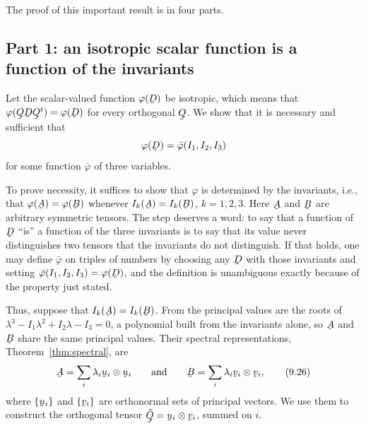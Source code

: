 The proof of this important result is in four parts.

\subsection*{Part 1: an isotropic scalar function is a function of the
invariants}

Let the scalar-valued function $\varphi(\bD)$ be isotropic, which means
that $\varphi(\bQ\bD\bQ^{t})=\varphi(\bD)$ for every orthogonal $\bQ$.
We show that it is necessary and sufficient that
\[
   \varphi(\bD)=\bar\varphi(I_{1},I_{2},I_{3})
\]
for some function $\bar\varphi$ of three variables.

To prove necessity, it suffices to show that $\varphi$ is determined by
the invariants, i.e., that $\varphi(\bA)=\varphi(\bB)$ whenever
$I_{k}(\bA)=I_{k}(\bB)$, $k=1,2,3$. Here $\bA$ and $\bB$ are arbitrary
symmetric tensors. The step deserves a word: to say that a function of
$\bD$ ``is'' a function of the three invariants is to say that its value
never distinguishes two tensors that the invariants do not distinguish.
If that holds, one may define $\bar\varphi$ on triples of numbers by
choosing any $\bD$ with those invariants and setting
$\bar\varphi(I_{1},I_{2},I_{3})=\varphi(\bD)$, and the definition is
unambiguous exactly because of the property just stated.

Thus, suppose that $I_{k}(\bA)=I_{k}(\bB)$. From  the principal
values are the roots of
$\lambda^{3}-I_{1}\lambda^{2}+I_{2}\lambda-I_{3}=0$, a polynomial built
from the invariants alone, so $\bA$ and $\bB$ share the same principal
values. Their spectral representations, Theorem~\ref{thm:spectral}, are
\begin{equation}
   \bA=\sum_{i}\lambda_{i}\bu_{i}\otimes\bu_{i}
   \qquad\text{and}\qquad
   \bB=\sum_{i}\lambda_{i}\bv_{i}\otimes\bv_{i},
   \tag{9.26}\label{eq:9.26}
\end{equation}
where $\{\bu_{i}\}$ and $\{\bv_{i}\}$ are orthonormal sets of principal
vectors. We use them to construct the orthogonal tensor
$\tilde\bQ=\bu_{i}\otimes\bv_{i}$, summed on $i$.


